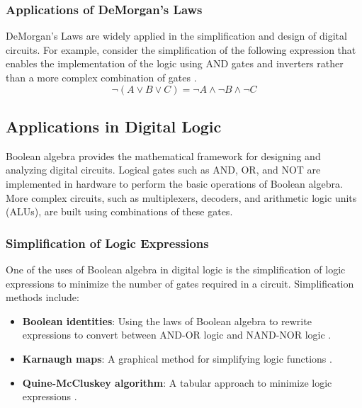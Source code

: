 \subsubsection{Applications of DeMorgan's Laws}
DeMorgan’s Laws are widely applied in the simplification and design of digital circuits. For example, consider the simplification of the following expression that enables the implementation of the logic using AND gates and inverters rather than a more complex combination of gates \cite{rosen2018, karnaugh1953}.
\[
\neg (A \lor B \lor C) = \neg A \land \neg B \land \neg C
\]

\subsection{Applications in Digital Logic}
Boolean algebra provides the mathematical framework for designing and analyzing digital circuits. Logical gates such as AND, OR, and NOT are implemented in hardware to perform the basic operations of Boolean algebra. More complex circuits, such as multiplexers, decoders, and arithmetic logic units (ALUs), are built using combinations of these gates.

\subsubsection{Simplification of Logic Expressions}
One of the uses of Boolean algebra in digital logic is the simplification of logic expressions to minimize the number of gates required in a circuit. Simplification methods include:

\begin{itemize}
    \item \textbf{Boolean identities}: Using the laws of Boolean algebra to rewrite expressions  to convert between AND-OR logic and NAND-NOR logic \cite{rosen2018}.
    \item \textbf{Karnaugh maps}: A graphical method for simplifying logic functions \cite{karnaugh1953}.
    \item \textbf{Quine-McCluskey algorithm}: A tabular approach to minimize logic expressions \cite{quine1952}.
\end{itemize}

